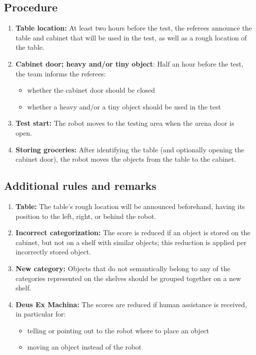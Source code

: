 \subsection*{Procedure}
\begin{enumerate}[nosep]
	\item \textbf{Table location:} At least two hours before the test, the referees announce the table and cabinet that will be used in the test, as well as a rough location of the table.
	\item \textbf{Cabinet door; heavy and/or tiny object}: Half an hour before the test, the team informs the referees:
		\begin{itemize}
			\item whether the cabinet door should be closed
			\item whether a heavy and/or a tiny object should be used in the test
		\end{itemize}
	\item \textbf{Test start:} The robot moves to the testing area when the arena door is open.
	\item \textbf{Storing groceries:} After identifying the table (and optionally opening the cabinet door), the robot moves the objects from the table to the cabinet.
\end{enumerate}


\subsection*{Additional rules and remarks}
\begin{enumerate}
	\item \textbf{Table:} The table's rough location will be announced beforehand, having its position to the left, right, or behind the robot.
	\item \textbf{Incorrect categorization:} The score is reduced if an object is stored on the cabinet, but not on a shelf with similar objects; this reduction is applied per incorrectly stored object.
	\item \textbf{New category:} Objects that do not semantically belong to any of the categories represented on the shelves should be grouped together on a new shelf.
	\item \textbf{Deus Ex Machina:} The scores are reduced if human assistance is received, in particular for:
	\begin{itemize}
		\item telling or pointing out to the robot where to place an object
		\item moving an object instead of the robot
	\end{itemize}
\end{enumerate}

